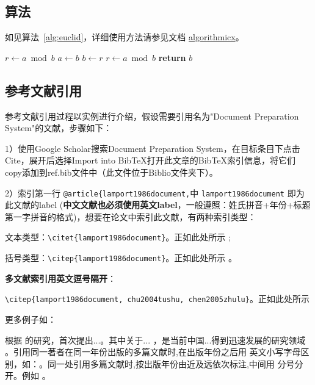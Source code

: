 \subsection{算法}

如见算法~\ref{alg:euclid}，详细使用方法请参见文档 \href{https://ctan.org/pkg/algorithmicx?lang=en}{algorithmicx}。

\begin{algorithm}[!htbp]
    \small
    \caption{Euclid's algorithm}\label{alg:euclid}
    \begin{algorithmic}[1]
        \State $r\gets a\bmod b$
        \State $a\gets b$
        \State $b\gets r$
        \State $r\gets a\bmod b$
        \EndWhile\label{euclidendwhile}
        \State \textbf{return} $b$
        \EndProcedure
    \end{algorithmic}
\end{algorithm}

\subsection{参考文献引用}

参考文献引用过程以实例进行介绍，假设需要引用名为"Document Preparation System"的文献，步骤如下：

1）使用Google Scholar搜索Document Preparation System，在目标条目下点击Cite，展开后选择Import into BibTeX打开此文章的BibTeX索引信息，将它们copy添加到ref.bib文件中（此文件位于Biblio文件夹下）。

2）索引第一行 \verb|@article{lamport1986document,|中 \verb|lamport1986document| 即为此文献的label (\textbf{中文文献也必须使用英文label}，一般遵照：姓氏拼音+年份+标题第一字拼音的格式)，想要在论文中索引此文献，有两种索引类型：

文本类型：\verb|\citet{lamport1986document}|。正如此处所示 \citet{lamport1986document}; 

括号类型：\verb|\citep{lamport1986document}|。正如此处所示 \citep{lamport1986document}。

\textbf{多文献索引用英文逗号隔开}：

\verb|\citep{lamport1986document, chu2004tushu, chen2005zhulu}|。正如此处所示 \citep{lamport1986document, chu2004tushu, chen2005zhulu}

更多例子如：

\citet{walls2013drought} 根据 \citet{betts2005aging} 的研究，首次提出...。其中关于... \citep{walls2013drought, betts2005aging}，是当前中国...得到迅速发展的研究领域 \citep{chen1980zhongguo, bravo1990comparative}。引用同一著者在同一年份出版的多篇文献时,在出版年份之后用
英文小写字母区别，如：\citep{yuan2012lana, yuan2012lanb, yuan2012lanc}。同一处引用多篇文献时,按出版年份由近及远依次标注,中间用
分号分开。例如 \citep{chen1980zhongguo, stamerjohanns2009mathml, hls2012jinji, niu2013zonghe}。

